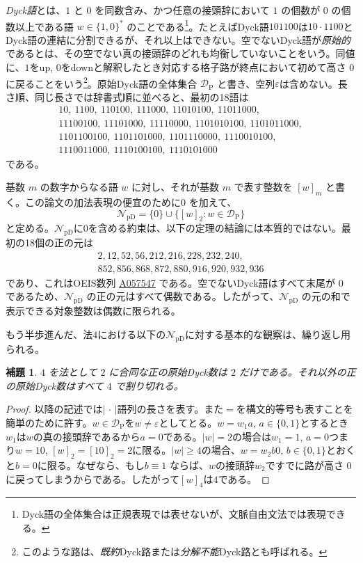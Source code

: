 \documentclass[12pt]{ltjsarticle}
\theoremstyle{plain}
\newtheorem{lemma}[theorem]{補題}
\theoremstyle{definition}
\theoremstyle{plain}
\newcommand{\val}[2]{[#1]_{#2}}
\newcommand{\NpD}{\mathcal{N}_{\mathrm{pD}}}
\newcommand{\DP}{\mathcal{D}_{\mathrm{P}}}
\newcommand{\seqnum}[1]{\href{https://oeis.org/#1}{\textrm{\underline{#1}}}}
\begin{document}
\emph{Dyck語}とは、$1$ と $0$ を同数含み、かつ任意の接頭辞において $1$ の個数が $0$ の個数以上である語 $w\in\{1,0\}^*$ のことである\footnote{Dyck語の全体集合は正規表現では表せないが、文脈自由文法では表現できる。}。たとえばDyck語$101100$は$10\cdot1100$とDyck語の連結に分割できるが、それ以上はできない。空でないDyck語が\emph{原始的}であるとは、その空でない真の接頭辞のどれも均衡していないことをいう。同値に、$1$をup, $0$をdownと解釈したとき対応する格子路が終点において初めて高さ $0$ に戻ることをいう\footnote{このような路は、\emph{既約}Dyck路または\emph{分解不能}Dyck路とも呼ばれる。}。原始Dyck語の全体集合 $\DP$ と書き、空列$\varepsilon$は含めない。長さ順、同じ長さでは辞書式順に並べると、最初の18語は
\[
\begin{gathered}
10,\ 1100,\ 110100,\ 111000,\ 11010100,\ 11011000,\\
11100100,\ 11101000,\ 11110000,\ 1101010100,\ 1101011000,\\
1101100100,\ 1101101000,\ 1101110000,\ 1110010100,\\
1110011000,\ 1110100100,\ 1110101000
\end{gathered}
\]
である。

基数 $m$ の数字からなる語 $w$ に対し、それが基数 $m$ で表す整数を $\val{w}{m}$ と書く。この論文の加法表現の便宜のために$0$ を加えて、
\[
 \NpD=\{0\}\cup\{\val{w}{2}:w\in\DP\}
\]
と定める。$\NpD$に$0$を含める約束は、以下の定理の結論には本質的ではない。最初の18個の正の元は
\[
\begin{gathered}
2,12,52,56,212,216,228,232,240,\\
852,856,868,872,880,916,920,932,936
\end{gathered}
\]
であり、これはOEIS数列 \seqnum{A057547} \cite{OEIS-A057547} である。空でないDyck語はすべて末尾が $0$ であるため、$\NpD$ の正の元はすべて偶数である。したがって、$\NpD$ の元の和で表示できる対象整数は偶数に限られる。

もう半歩進んだ、法$4$における以下の$\NpD$に対する基本的な観察は、繰り返し用られる。

\begin{lemma}\label{lem:mod4}
$4$ を法として $2$ に合同な正の原始Dyck数は $2$ だけである。それ以外の正の原始Dyck数はすべて $4$ で割り切れる。
\end{lemma}

\begin{proof}
以降の記述では$|\,\cdot\,|$語列の長さを表す。また$=$を構文的等号も表すことを簡単のために許す。$w\in\DP$を$w\neq\varepsilon$としてとる。$w=w_1a$, $a\in\{0,1\}$とするとき$w_1$は$w$の真の接頭辞であるから$a=0$である。$|w|=2$の場合は$w_1=1$, $a=0$つまり$w=10$, $[w]_2=[10]_2=2$に限る。$|w|\geq4$の場合、$w=w_2b0$, $b\in\{0,1\}$とおくと$b=0$に限る。なぜなら、もし$b\equiv1$ ならば、$w$の接頭辞$w_2$ですでに路が高さ $0$ に戻ってしまうからである。したがって$[w]_4$は$4$である。
\end{proof}
\end{document}
